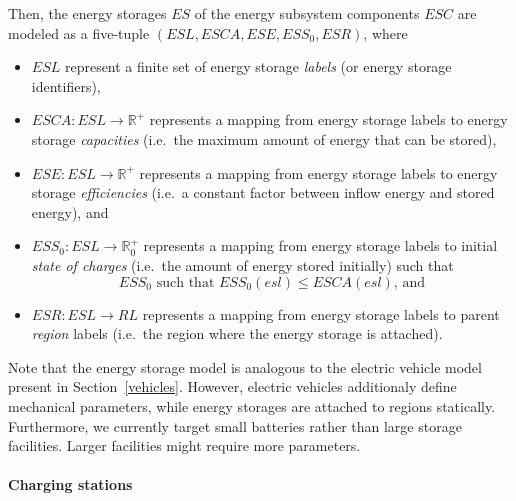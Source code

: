 Then, the energy storages $ES$ of the energy subsystem components $ESC$ are modeled as a five-tuple $(ESL, ESCA, ESE, ESS_0, ESR)$, where
\begin{itemize}
	\item $ESL$ represent a finite set of energy storage \textit{labels} (or energy storage identifiers),
	\item $ESCA: ESL \rightarrow \mathbb{R}^+$ represents a mapping from energy storage labels to energy storage \textit{capacities} (i.e.\ the maximum amount of energy that can be stored),
	\item $ESE: ESL \rightarrow \mathbb{R}^+$ represents a mapping from energy storage labels to energy storage \textit{efficiencies} (i.e.\ a constant factor between inflow energy and stored energy), and
	\item $ESS_0: ESL \rightarrow \mathbb{R}_0^+$ represents a mapping from energy storage labels to initial \textit{state of charges} (i.e.\ the amount of energy stored initially) such that
	\[
		ESS_0 \textrm{ such that } ESS_0(esl) \leq ESCA(esl) \textrm{, and}
	\]
	\item $ESR: ESL \rightarrow RL$ represents a mapping from energy storage labels to parent \textit{region} labels (i.e.\ the region where the energy storage is attached).
\end{itemize}
Note that the energy storage model is analogous to the electric vehicle model present in Section~\ref{vehicles}. However, electric vehicles additionaly define mechanical parameters, while energy storages are attached to regions statically. Furthermore, we currently target small batteries rather than large storage facilities. Larger facilities might require more parameters.

\paragraph{Charging stations}
\label{charging_stations}

